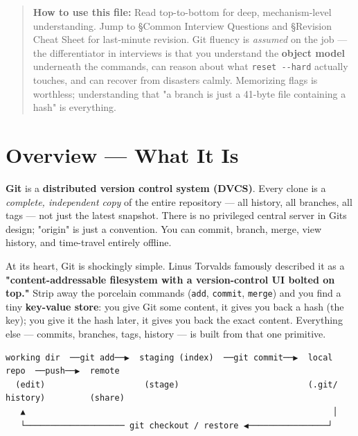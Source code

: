 \documentclass[11pt]{article}
\begin{document}
\makecoverpage

\thispagestyle{empty}
{\hypersetup{hidelinks}\tableofcontents}
\clearpage

\begin{quote}
\textbf{How to use this file:} Read top-to-bottom for deep, mechanism-level understanding. Jump to §Common Interview Questions and §Revision Cheat Sheet for last-minute revision. Git fluency is \emph{assumed} on the job --- the differentiator in interviews is that you understand the \textbf{object model} underneath the commands, can reason about what \texttt{reset\ -\/-hard} actually touches, and can recover from disasters calmly. Memorizing flags is worthless; understanding that "a branch is just a 41-byte file containing a hash" is everything.
\end{quote}

\section{Overview --- What It Is}\label{overview--what-it-is}

\textbf{Git} is a \textbf{distributed version control system (DVCS)}. Every clone is a \emph{complete, independent copy} of the entire repository --- all history, all branches, all tags --- not just the latest snapshot. There is no privileged central server in Git\textquotesingle s design; "origin" is just a convention. You can commit, branch, merge, view history, and time-travel entirely offline.

At its heart, Git is shockingly simple. Linus Torvalds famously described it as a \textbf{"content-addressable filesystem with a version-control UI bolted on top."} Strip away the porcelain commands (\texttt{add}, \texttt{commit}, \texttt{merge}) and you find a tiny \textbf{key-value store}: you give Git some content, it gives you back a hash (the key); you give it the hash later, it gives you back the exact content. Everything else --- commits, branches, tags, history --- is built from that one primitive.

\setcodelang{}

\begin{verbatim}
working dir  ──git add──▶  staging (index)  ──git commit──▶  local repo  ──push──▶  remote
  (edit)                    (stage)                          (.git/ history)         (share)
   ▲                                                              │
   └──────────────────── git checkout / restore ◀────────────────┘
\end{verbatim}
\end{document}
